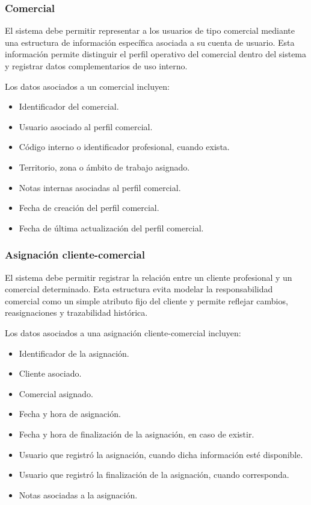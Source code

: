\subsubsection*{Comercial}

El sistema debe permitir representar a los usuarios de tipo comercial mediante una estructura de información específica asociada a su cuenta de usuario. Esta información permite distinguir el perfil operativo del comercial dentro del sistema y registrar datos complementarios de uso interno.

Los datos asociados a un comercial incluyen:

\begin{itemize}
    \item Identificador del comercial.
    \item Usuario asociado al perfil comercial.
    \item Código interno o identificador profesional, cuando exista.
    \item Territorio, zona o ámbito de trabajo asignado.
    \item Notas internas asociadas al perfil comercial.
    \item Fecha de creación del perfil comercial.
    \item Fecha de última actualización del perfil comercial.
\end{itemize}

\subsubsection*{Asignación cliente-comercial}

El sistema debe permitir registrar la relación entre un cliente profesional y un comercial determinado. Esta estructura evita modelar la responsabilidad comercial como un simple atributo fijo del cliente y permite reflejar cambios, reasignaciones y trazabilidad histórica.

Los datos asociados a una asignación cliente-comercial incluyen:

\begin{itemize}
    \item Identificador de la asignación.
    \item Cliente asociado.
    \item Comercial asignado.
    \item Fecha y hora de asignación.
    \item Fecha y hora de finalización de la asignación, en caso de existir.
    \item Usuario que registró la asignación, cuando dicha información esté disponible.
    \item Usuario que registró la finalización de la asignación, cuando corresponda.
    \item Notas asociadas a la asignación.
\end{itemize}

